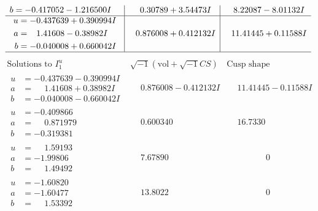 \documentclass[1p]{elsarticle_modified}
\theoremstyle{definition}
\newcommand{\I}{\sqrt{-1}}
\begin{document}
$$\begin{array}{c|c|c}
\begin{aligned}
b &= -0.417052 - 1.216500 I\end{aligned}
 & \phantom{-}0.30789 + 3.54473 I & \phantom{-}8.22087 - 8.01132 I \\ \hline\begin{aligned}
u &= -0.437639 + 0.390994 I \\
a &= \phantom{-}1.41608 - 0.38982 I \\
b &= -0.040008 + 0.660042 I\end{aligned}
 & \phantom{-}0.876008 + 0.412132 I & \phantom{-}11.41445 + 0.11588 I\\
 \hline 
 \end{array}$$\newpage$$\begin{array}{c|c|c}  
\text{Solutions to }I^u_{1}& \I (\text{vol} + \sqrt{-1}CS) & \text{Cusp shape}\\
 \hline 
\begin{aligned}
u &= -0.437639 - 0.390994 I \\
a &= \phantom{-}1.41608 + 0.38982 I \\
b &= -0.040008 - 0.660042 I\end{aligned}
 & \phantom{-}0.876008 - 0.412132 I & \phantom{-}11.41445 - 0.11588 I \\ \hline\begin{aligned}
u &= -0.409866\phantom{ +0.000000I} \\
a &= \phantom{-}0.871979\phantom{ +0.000000I} \\
b &= -0.319381\phantom{ +0.000000I}\end{aligned}
 & \phantom{-}0.600340\phantom{ +0.000000I} & \phantom{-}16.7330\phantom{ +0.000000I} \\ \hline\begin{aligned}
u &= \phantom{-}1.59193\phantom{ +0.000000I} \\
a &= -1.99806\phantom{ +0.000000I} \\
b &= \phantom{-}1.49492\phantom{ +0.000000I}\end{aligned}
 & \phantom{-}7.67890\phantom{ +0.000000I} & \phantom{-0.000000 } 0 \\ \hline\begin{aligned}
u &= -1.60820\phantom{ +0.000000I} \\
a &= -1.60477\phantom{ +0.000000I} \\
b &= \phantom{-}1.53392\phantom{ +0.000000I}\end{aligned}
 & \phantom{-}13.8022\phantom{ +0.000000I} & \phantom{-0.000000 } 0 \\ \hline\begin{aligned}

\end{aligned}
\end{array}$$
\end{document}
